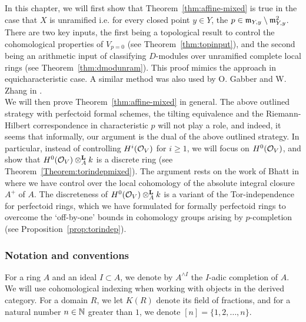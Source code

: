 In this chapter, we will first show that Theorem~\ref{thm:affine-mixed} is true in the case that $X$ is unramified i.e. 
for every closed point $y \in Y$, the $p \in \ideal{m}_{Y,y} \setminus \ideal{m}_{Y,y}^2$. There are two key inputs, the first being a topological
result to control the cohomological properties of $V_{p=0}$ (see Theorem~\ref{thm:topinput}), and the second being an arithmetic input of classifying $D$-modules over unramified complete local rings (see Theorem~\ref{thm:dmodunram}).
This proof mimics the approach in equicharacteristic case. A similar method was also used by O. Gabber and W. Zhang in \cite{gabber}.\\
\indent We will then prove Theorem~\ref{thm:affine-mixed} in general. The above outlined strategy with perfectoid formal schemes, the tilting equivalence and the Riemann-Hilbert correspondence in characteristic $p$
will not play a role, and indeed, it seems that informally, our argument is the dual of the above outlined strategy. In particular,
instead of controlling $H^i(\cal{O}_V)$ for $i\ge 1$, we will focus on $H^0(\cal{O}_V)$, and show that $H^0(\cal{O}_V)\otimesl_A k$ is a discrete ring (see Theorem~\ref{Theorem:torindepmixed}).
The argument rests on the work of Bhatt in \cite{bhattcohen} where we have control over the local cohomology of the absolute integral closure
$A^{+}$ of $A$. The discreteness of $H^0(\cal{O}_V)\otimesl_A k$ is a variant of the Tor-independence for perfectoid rings, which we have formulated for formally perfectoid rings 
to overcome the `off-by-one' bounds in cohomology groups arising
by $p$-completion (see Proposition~\ref{prop:torindep}).

\subsubsection*{Notation and conventions}
For a ring $A$ and an ideal $I \subset A$, we denote by $A^{\wedge I}$ the $I$-adic completion of $A$. We will
use cohomological indexing when working with objects in the derived category. 
For a domain $R$, we let $K(R)$ denote its field of fractions, and for a natural number $n \in \bb{N}$ greater than $1$, we denote $[n]=\{1,2,\ldots,n\}$.

